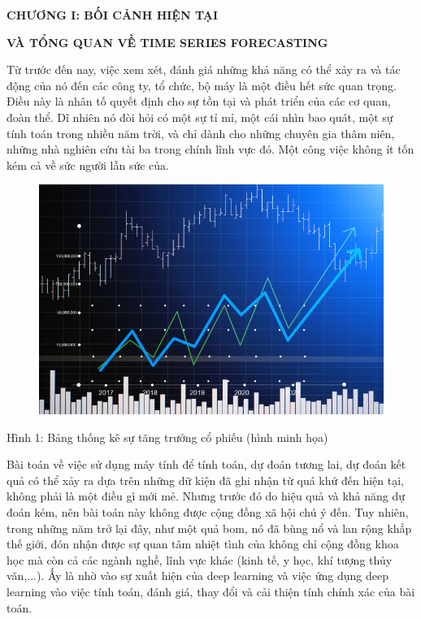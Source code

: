
\newpage
\changefontsizes{16pt}
\centerline{\textbf{CHƯƠNG I: BỐI CẢNH HIỆN TẠI}}
\centerline{\textbf{VÀ TỔNG QUAN VỀ TIME SERIES FORECASTING}}

\vspace{1.2cm}
\changefontsizes{13pt}
\setlength{\parindent}{0cm}
Từ trước đến nay, việc xem xét, đánh giá những khả năng có thể xảy ra và tác động của nó đến các công ty, tổ chức, bộ máy là một điều hết sức quan trọng. Điều này là nhân tố quyết định cho sự tồn tại và phát triển của các cơ quan, đoàn thể. Dĩ nhiên nó đòi hỏi có một sự tỉ mỉ, một cái nhìn bao quát, một sự tính toán trong nhiều năm trời, và chỉ dành cho những chuyên gia thâm niên, những nhà nghiên cứu tài ba trong chính lĩnh vực đó. Một công việc không ít tốn kém cả về sức người lẫn sức của.


\begin{center}
	\begin{figure}[htp]
		\begin{center}
			\includegraphics[scale=2.2]{./images/stock.jpg}
		\end{center}
	\end{figure}
\label{fig1}{Hình 1: Bảng thống kê sự tăng trưởng cổ phiếu (hình minh họa)}
\end{center}

Bài toán về việc sử dụng máy tính để tính toán, dự đoán tương lai, dự đoán kết quả có thể xảy ra dựa trên những dữ kiện đã ghi nhận từ quá khứ đến hiện tại, không phải là một điều gì mới mẻ. Nhưng trước đó do hiệu quả và khả năng dự đoán kém, nên bài toán này không được cộng đồng xã hội chú ý đến. Tuy nhiên, trong những năm trở lại đây, như một quả bom, nó đã bùng nổ và lan rộng khắp thế giới, đón nhận được sự quan tâm nhiệt tình của không chỉ cộng đồng khoa học mà còn cả các ngành nghề, lĩnh vực khác (kinh tế, y học, khí tượng thủy văn,...). Ấy là nhờ vào sự xuất hiện của deep learning và việc ứng dụng deep learning vào việc tính toán, đánh giá, thay đổi và cải thiện tính chính xác của bài toán.


